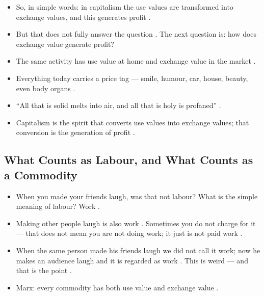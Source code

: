 \begin{itemize}
    \item So, in simple words: in capitalism the use values are transformed into exchange values, and this generates profit .
    \item But that does not fully answer the question . The next question is: how does exchange value generate profit? 
\end{itemize}

\begin{QuickRevision}
\begin{itemize}
    \item The same activity has use value at home and exchange value in the market .
    \item Everything today carries a price tag --- smile, humour, car, house, beauty, even body organs .
    \item ``All that is solid melts into air, and all that is holy is profaned'' .
    \item Capitalism is the spirit that converts use values into exchange values; that conversion is the generation of profit .
\end{itemize}
\end{QuickRevision}

\subsection{What Counts as Labour, and What Counts as a Commodity}
\begin{itemize}
    \item When you made your friends laugh, was that not labour? What is the simple meaning of labour? Work .
    \item Making other people laugh is also work . Sometimes you do not charge for it --- that does not mean you are not doing work; it just is not paid work .
    \item When the same person made his friends laugh we did not call it work; now he makes an audience laugh and it is regarded as work . This is weird --- and that is the point .
    \item Marx: every commodity has both use value and exchange value .
\end{itemize}

